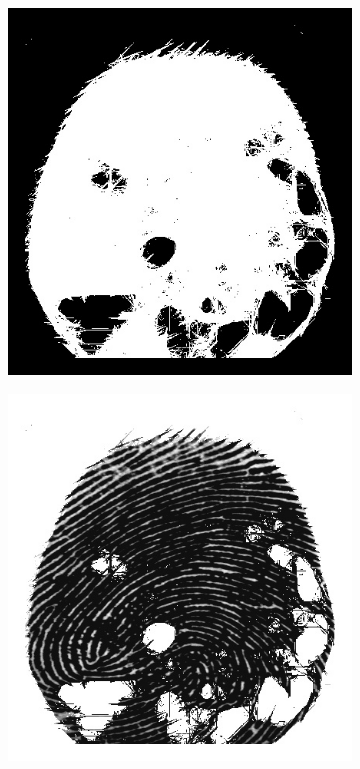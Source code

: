 \documentclass{beamer}
\begin{document}
{\begin{figure}[!ht]
\begin{subfigure}[ht]{0.15\textwidth}
        \end{subfigure}
        \qquad
        \begin{subfigure}[ht]{0.15\textwidth}
            \includegraphics[width=\textwidth]{fingerprints/2000Db3a/1_2_mask.jpg}
        \end{subfigure}
        \qquad
        \begin{subfigure}[ht]{0.15\textwidth}
            \includegraphics[width=\textwidth]{fingerprints/2000Db3a/1_2_filtered.jpg}

\end{subfigure}
\end{figure}}
\end{document}
